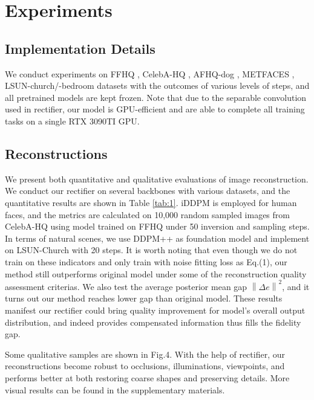 \documentclass[letterpaper]{article} %
\begin{document}
\section{Experiments}

\subsection{Implementation Details}
We conduct experiments on FFHQ \cite{karras2019style}, CelebA-HQ \cite{karras2017progressive}, AFHQ-dog \cite{choi2020stargan}, METFACES \cite{karras2020training}, LSUN-church/-bedroom \cite{yu2015lsun} datasets with the outcomes of various levels of steps, and all pretrained models are kept frozen. Note that due to the separable convolution used in rectifier, our model is GPU-efficient and are able to complete all training tasks on a single RTX 3090TI GPU.


\subsection{Reconstructions}
We present both quantitative and qualitative evaluations of image reconstruction.
We conduct our rectifier on several backbones with various datasets, and the quantitative results are shown in Table \ref{tab:1}.
iDDPM \cite{nichol2021improved} is employed for human faces, and the metrics are calculated on 10,000 random sampled images from CelebA-HQ using model trained on FFHQ under 50 inversion and sampling steps. In terms of natural scenes, we use DDPM++ \cite{song2020score} as foundation model and implement on LSUN-Church \cite{yu2015lsun} with 20 steps.
It is worth noting that even though we do not train on these indicators and only train with noise fitting loss as Eq.(1), our method still outperforms original model under some of the reconstruction quality assessment criterias. We also test the average posterior mean gap $\left \| \Delta e \right \| ^2$, and it turns out our method reaches lower gap than original model. These results manifest our rectifier could bring quality improvement for model's overall output distribution, and indeed provides compensated information thus fills the fidelity gap.

Some qualitative samples are shown in Fig.4. With the help of rectifier, our reconstructions become robust to occlusions, illuminations, viewpoints, and performs better at both restoring coarse shapes and  preserving details. More visual results can be found in the supplementary materials.
\end{document}

